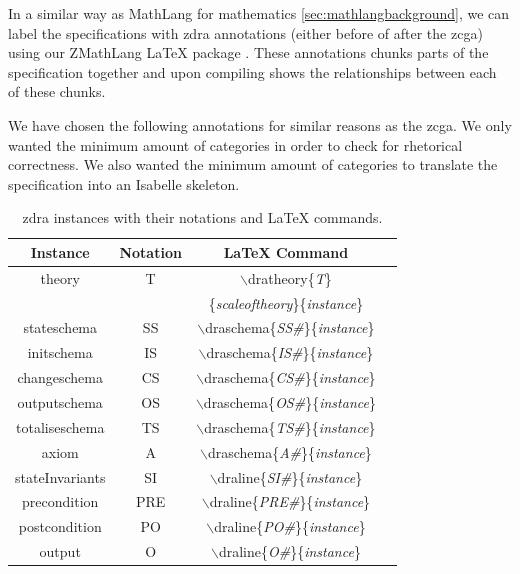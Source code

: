 In a similar way as  MathLang for mathematics \ref{sec:mathlangbackground}, we can label the specifications with
\gls{zdra} annotations (either before of after the \gls{zcga}) using our ZMathLang \LaTeX{} package . These
annotations chunks parts of the specification together and upon compiling shows
the relationships between each of these chunks.

We have chosen the following annotations for similar reasons as the \gls{zcga}.
We only wanted the minimum amount of categories in order to check for rhetorical
correctness. We also wanted the minimum amount of categories to translate the
specification into an Isabelle skeleton.

\begin{table}[H]
\begin{tabular}{| c | c | c | c |}
\hline
\textbf{Instance} & \textbf{Notation} & \textbf{\LaTeX{} Command}  \\
\hline
theory & T & $\backslash$dratheory\{\textit{T}\}\\
& & \{\textit{scaleoftheory}\}\{\textit{instance}\}  \\
\hline
stateschema & SS & $\backslash$draschema\{\textit{SS\#}\}\{\textit{instance}\}
\\
\hline
initschema & IS & $\backslash$draschema\{\textit{IS\#}\}\{\textit{instance}\}
\\
\hline
changeschema & CS & $\backslash$draschema\{\textit{CS\#}\}\{\textit{instance}\}
\\
\hline
outputschema & OS & $\backslash$draschema\{\textit{OS\#}\}\{\textit{instance}\}
\\
\hline
totaliseschema & TS &
$\backslash$draschema\{\textit{TS\#}\}\{\textit{instance}\}  \\
\hline
axiom & A  & $\backslash$draschema\{\textit{A\#}\}\{\textit{instance}\}  \\
\hline
stateInvariants & SI & $\backslash$draline\{\textit{SI\#}\}\{\textit{instance}\}
\\
\hline
precondition & PRE & $\backslash$draline\{\textit{PRE\#}\}\{\textit{instance}\}
\\
\hline
postcondition & PO  & $\backslash$draline\{\textit{PO\#}\}\{\textit{instance}\}
\\
\hline
output & O  & $\backslash$draline\{\textit{O\#}\}\{\textit{instance}\}  \\
\hline
\end{tabular}
\caption{\label{tab:instances} \gls{zdra} instances with their notations and \LaTeX{} commands.}
\end{table}

